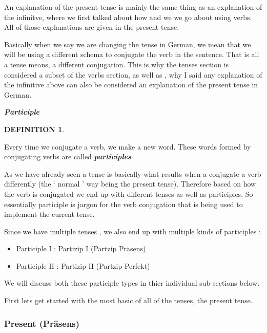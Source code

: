 \documentclass[a4paper,twocolumn,10pt]{article}
\newtheorem{mydef}{DEFINITION}[section]
\newcommand{\newpar}
{\par \vspace{0.3cm}}
\newcommand{\tcolorboxstart}
{
	\nolinenumbers
	\vspace{0.2cm}
	\centering
}
\newcommand{\tcolorboxend}
{
	\justifying
	\vspace{0.2cm}
	\linenumbers
}
\newcommand{\tcolorboxdefinition}[3]
{

\tcolorboxstart
\begin{defn-bg}

	\begin{defn-title}[width=7cm]{}
	{
		\normalsize \textbf{\textit{#1}}
	}
	\end{defn-title}

	\begin{defn-theword}
	{
		\footnotesize
		\begin{mydef} #2
		\end{mydef}
	}
	\end{defn-theword}


	\begin{defn-content}

	\justify
	#3

	\end{defn-content}

\end{defn-bg}
\tcolorboxend
}
\begin{document}

An explanation of the present tense is mainly the same thing as an explanation
of the infinitve, where we first talked about how and we we go about using
verbs. All of those explanations are given in the present tense.\newpar

Basically when we say we are changing the tense in German, we mean that we will
be using a different schema to conjugate the verb in the sentence. That is all a
tense means, a different conjugation. This is why the tenses section is
considered a subset of the verbs section, as well as , why I said any
explanation of the infinitive above can also be considered an explanation of the
present tense in German. 

\tcolorboxdefinition
{Participle}
{\label{def:participle}}
{

	Every time we conjugate a verb, we make a new word. These words formed by
	conjugating verbs are called \textbf{\textit{participles}}.

}


As we have already seen a tense is basically what results when a conjugate a
verb differently (the ` normal ' way being the present tense). Therefore based
on how the verb is conjugated we end up with different tenses as well as
participles. So essentially participle is jargon for the verb conjugation that
is being used to implement the current tense.\newpar

Since we have multiple tenses , we also end up with multiple kinds of
participles :

\begin{itemize}[noitemsep]

	\item Participle I : Partizip I (Partzip Präsens)
	\item Participle II : Partizip II (Partzip Perfekt)

\end{itemize}

We will discuss both these participle types in thier individual sub-sections
below.\newpar

First lets get started with the most basic of all of the tenses, the present
tense.


\subsubsection{Present (Präsens)}
\label{sssec:present}
\end{document}
